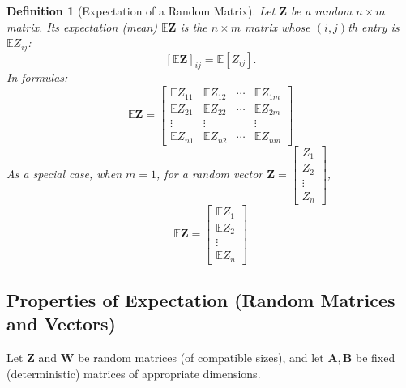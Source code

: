 \documentclass[12pt]{article}
\newtheorem{definition}{Definition}[section]
\begin{document}
\begin{definition}[Expectation of a Random Matrix]
Let $\boldsymbol{Z}$ be a random $n \times m$ matrix. Its expectation (mean) $\mathbb{E}\boldsymbol{Z}$ is the $n\times m$ matrix whose $(i,j)$th entry is $\mathbb{E}Z_{ij}$:
\[
[\mathbb{E}\boldsymbol{Z}]_{ij} = \mathbb{E}[Z_{ij}].
\]
In formulas:
\[
\mathbb{E} \boldsymbol{Z} = 
\begin{bmatrix}
\mathbb{E} Z_{11} & \mathbb{E} Z_{12} & \cdots & \mathbb{E} Z_{1m} \\
\mathbb{E} Z_{21} & \mathbb{E} Z_{22} & \cdots & \mathbb{E} Z_{2m} \\
\vdots & \vdots & & \vdots \\
\mathbb{E} Z_{n1} & \mathbb{E} Z_{n2} & \cdots & \mathbb{E} Z_{nm}
\end{bmatrix}
\]
As a special case, when $m=1$, for a random vector $\boldsymbol{Z} = \begin{bmatrix} Z_1 \\ Z_2 \\ \vdots \\ Z_n \end{bmatrix}$,
\[
\mathbb{E} \boldsymbol{Z} =
\begin{bmatrix}
\mathbb{E} Z_1 \\
\mathbb{E} Z_2 \\
\vdots \\
\mathbb{E} Z_n
\end{bmatrix}
\]
\end{definition}

\subsection{Properties of Expectation (Random Matrices and Vectors)}

Let $\boldsymbol{Z}$ and $\boldsymbol{W}$ be random matrices (of compatible sizes), and let $\boldsymbol{A}, \boldsymbol{B}$ be fixed (deterministic) matrices of appropriate dimensions.
\end{document}
